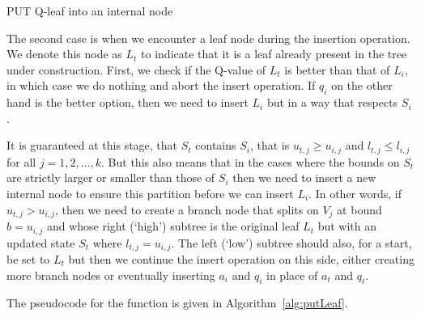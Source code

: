 \documentclass{article}
\begin{document}
\begin{algorithm}[ht]
    \caption{PUT Q-leaf into an internal node}\label{alg:putInternal}

    \begin{algorithmic}[1]
            
        \EndIf%
        \EndIf%

        \EndFunction%

    \end{algorithmic}

\end{algorithm}

The second case is when we encounter a leaf node during the insertion operation.
We denote this node as $L_t$ to indicate that it is a leaf already present in
the tree under construction. First, we check if the Q-value of $L_t$ is better
than that of $L_i$, in which case we do nothing and abort the insert operation.
If $q_i$ on the other hand is the better option, then we need to insert $L_i$
but in a way that respects $S_i$.

It is guaranteed at this stage, that $S_t$ contains $S_i$, that is $u_{t,j} \geq
u_{i,j}$ and $l_{t,j} \leq l_{i,j}$ for all $j=1,2,\ldots,k$. But this also
means that in the cases where the bounds on $S_t$ are strictly larger or smaller
than those of $S_i$ then we need to insert a new internal node to ensure this
partition before we can insert $L_i$. In other words, if $u_{t,j} > u_{i,j}$,
then we need to create a branch node that splits on $V_j$ at bound $b =
u_{i,j}$ and whose right (`high') subtree is the original leaf $L_t$ but with an
updated state $S_t$ where $l_{t,j} = u_{i,j}$. The left (`low') subtree should
also, for a start, be set to $L_t$ but then we continue the insert operation on
this side, either creating more branch nodes or eventually inserting $a_i$ and
$q_i$ in place of $a_t$ and $q_t$.

The pseudocode for the function is given in Algorithm~\ref{alg:putLeaf}.
\end{document}
